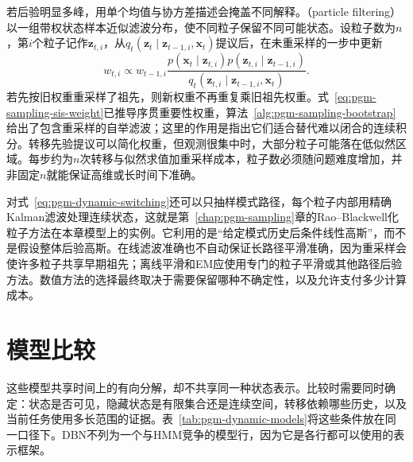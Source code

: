 若后验明显多峰，用单个均值与协方差描述会掩盖不同解释。（particle filtering）以一组带权状态样本近似滤波分布，使不同粒子保留不同可能状态。设粒子数为$n$，第$i$个粒子记作$\bm z_{t,i}$，从$q_t(\bm z_t\mid\bm z_{t-1,i},\bm x_t)$提议后，在未重采样的一步中更新
\[
  w_{t,i}\propto w_{t-1,i}
    \frac{p(\bm x_t\mid\bm z_{t,i})
      p(\bm z_{t,i}\mid\bm z_{t-1,i})}
      {q_t(\bm z_{t,i}\mid\bm z_{t-1,i},\bm x_t)}.
\]
若先按旧权重重采样了祖先，则新权重不再重复乘旧祖先权重。式~\eqref{eq:pgm-sampling-sis-weight}已推导序贯重要性权重，算法~\ref{alg:pgm-sampling-bootstrap}给出了包含重采样的自举滤波；这里的作用是指出它们适合替代难以闭合的连续积分。转移先验提议可以简化权重，但观测很集中时，大部分粒子可能落在低似然区域。每步约为$n$次转移与似然求值加重采样成本，粒子数必须随问题难度增加，并非固定$n$就能保证高维或长时间下准确。

对式~\eqref{eq:pgm-dynamic-switching}还可以只抽样模式路径，每个粒子内部用精确Kalman滤波处理连续状态，这就是第~\ref{chap:pgm-sampling}章的Rao--Blackwell化粒子方法在本章模型上的实例。它利用的是“给定模式历史后条件线性高斯”，而不是假设整体后验高斯。在线滤波准确也不自动保证长路径平滑准确，因为重采样会使许多粒子共享早期祖先；离线平滑和EM应使用专门的粒子平滑或其他路径后验方法。数值方法的选择最终取决于需要保留哪种不确定性，以及允许支付多少计算成本。

\section{模型比较}
\label{sec:pgm-dynamic-comparison}

这些模型共享时间上的有向分解，却不共享同一种状态表示。比较时需要同时确定：状态是否可见，隐藏状态是有限集合还是连续空间，转移依赖哪些历史，以及当前任务使用多长范围的证据。表~\ref{tab:pgm-dynamic-models}将这些条件放在同一口径下。DBN不列为一个与HMM竞争的模型行，因为它是各行都可以使用的表示框架。


